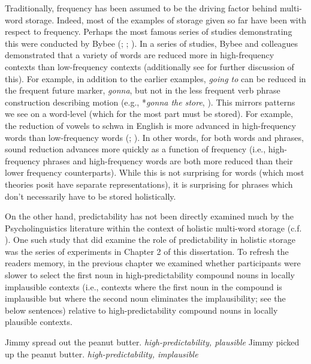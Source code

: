 \documentclass[
  12pt,
  letterpaper,
]{scrreport}
\begin{document}
Traditionally, frequency has been assumed to be the driving factor
behind multi-word storage. Indeed, most of the examples of storage given
so far have been with respect to frequency. Perhaps the most famous
series of studies demonstrating this were conducted by Bybee
(; ; ). In a series of studies, Bybee and colleagues
demonstrated that a variety of words are reduced more in high-frequency
contexts than low-frequency contexts (additionally see
 for further discussion of this). For example, in addition to the
earlier examples, \emph{going to} can be reduced in the frequent future
marker, \emph{gonna}, but not in the less frequent verb phrase
construction describing motion (e.g., *\emph{gonna the store},
). This mirrors patterns we see on
a word-level (which for the most part must be stored). For example, the
reduction of vowels to schwa in English is more advanced in
high-frequency words than low-frequency words
(;
). In other
words, for both words and phrases, sound reduction advances more quickly
as a function of frequency (i.e., high-frequency phrases and
high-frequency words are both more reduced than their lower frequency
counterparts). While this is not surprising for words (which most
theories posit have separate representations), it is surprising for
phrases which don't necessarily have to be stored holistically.

On the other hand, predictability has not been directly examined much by
the Psycholinguistics literature within the context of holistic
multi-word storage (c.f.
). One such study that did examine the role of predictability in
holistic storage was the series of experiments in Chapter 2 of this
dissertation. To refresh the readers memory, in the previous chapter we
examined whether participants were slower to select the first noun in
high-predictability compound nouns in locally implausible contexts
(i.e., contexts where the first noun in the compound is implausible but
where the second noun eliminates the implausibility; see the below
sentences) relative to high-predictability compound nouns in locally
plausible contexts.

\begin{exe}
\ex
\begin{xlist}
\ex Jimmy spread out the peanut butter. \hfill \emph{high-predictability, plausible}
\ex Jimmy picked up the peanut butter. \hfill \emph{high-predictability, implausible}
\end{xlist}
\end{exe}
\end{document}
